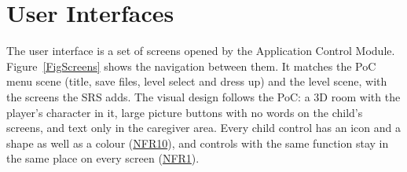 \documentclass[12pt, titlepage]{article}
\newcommand{\srsurl}{https://team-hindsight.github.io/ophthamology-game/SRS/SRS.pdf}
\newcommand{\srsnfrref}[2]{\href{\srsurl\#nameddest=#1}{NFR#2}}
\begin{document}
\section{User Interfaces} \label{SecUI}

The user interface is a set of screens opened by the Application Control
Module. Figure~\ref{FigScreens} shows the navigation between them. It matches
the PoC menu scene (title, save files, level select and dress up) and the level
scene, with the screens the SRS adds. The visual design follows the PoC: a 3D
room with the player's character in it, large picture buttons with no words on
the child's screens, and text only in the caregiver area. Every child control
has an icon and a shape as well as a colour (\srsnfrref{NFR_Colour}{10}), and
controls with the same function stay in the same place on every screen
(\srsnfrref{NFR_Layout}{1}).
\end{document}
